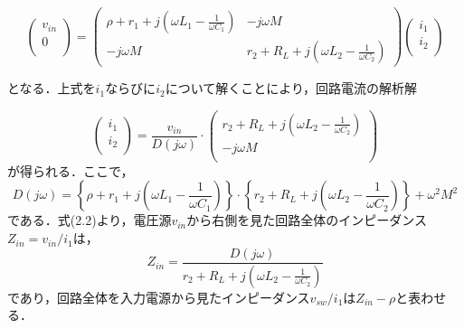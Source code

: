 \begin{equation}
\begin{pmatrix}
v_{in}\\
0\\
\end{pmatrix} 
=
\begin{pmatrix}
\rho+r_1+j\left(\omega L_1 -\frac{1}{\omega C_1}\right) & -j\omega M \\
-j\omega M & r_2+R_L+j\left(\omega L_2 -\frac{1}{\omega C_2}\right)
\end{pmatrix}
\begin{pmatrix}
i_1 \\
i_2\\\end{pmatrix}
\end{equation}

となる．上式を$i_1$ならびに$i_2$について解くことにより，回路電流の解析解

\begin{equation}
\begin{pmatrix}
i_1 \\
i_2 \\
\end{pmatrix}
=
\frac{v_{in}}{D(j\omega)} \cdot
\begin{pmatrix}
r_2+R_L+j(\omega L_2 -\frac{1}{\omega C_2}) \\
-j\omega M \\
\end{pmatrix}
\end{equation}
が得られる．ここで，
\begin{equation}
D(j\omega)=\left\{\rho+r_1+j\left(\omega L_1 -\frac{1}{\omega C_1}\right)\right\} \cdot \left\{{r_2+R_L+j\left(\omega L_2 -\frac{1}{\omega C_2}\right)}\right\}+\omega^2 M^2
\end{equation}
である．式(2.2)より，電圧源$v_{in}$から右側を見た回路全体のインピーダンス$Z_{in}=v_{in}/i_1$は，
\begin{equation}
Z_{in}=\frac{D(j\omega)}{r_2+R_L+j\left(\omega L_2 -\frac{1}{\omega C_2}\right)}
\end{equation}
であり，回路全体を入力電源から見たインピーダンス$v_{sw}/i_1$は$Z_{in}-\rho$と表わせる．\par

